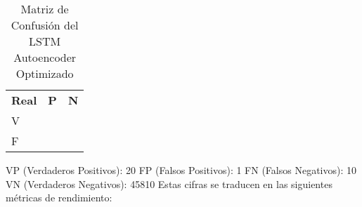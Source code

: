       \begin{table}[ht!]
            \doublespacing
            \small
            \centering
            \begin{tabular}{ >{\centering\arraybackslash}p{3cm} >{\centering\arraybackslash}p{3cm} >{\centering\arraybackslash}p{3cm} }
                  \hline
                                & \multicolumn{2}{c}{\textbf{Esperado}}              \\
                  \hline
                  \textbf{Real} & \textbf{P}                            & \textbf{N} \\
                  \hline
                  V             & 20                                    & 10      \\
                  F             & 1                                     & 45810         \\
                  \hline
            \end{tabular}
            \caption{Matriz de Confusión del LSTM Autoencoder Optimizado}
            \label{tab:confusion_matrix_lstm_optimized}
      \end{table}

      VP (Verdaderos Positivos): 20
      FP (Falsos Positivos): 1
      FN (Falsos Negativos): 10
      VN (Verdaderos Negativos): 45810
      Estas cifras se traducen en las siguientes métricas de rendimiento:

